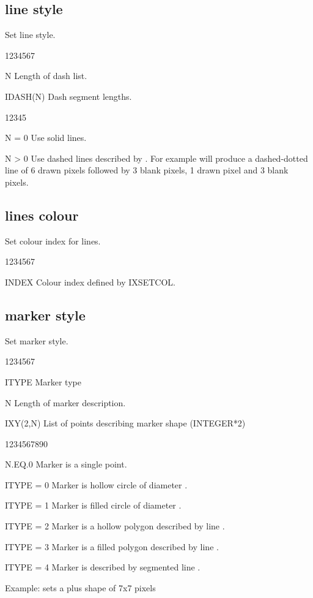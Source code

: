 \subsection{ line style}
%
\Action
Set line style.
\Pdesc
\begin{DLtt}{1234567}
\item[N] Length of dash list.
\item[IDASH(N)] Dash segment lengths.
\begin{DLtt}{12345}
\item[N = 0] Use solid lines.
\item[N > 0] Use dashed lines described by . For example
              will produce a
       dashed-dotted line of 6 drawn pixels followed by 3 blank pixels, 1
       drawn pixel and 3 blank pixels.
\end{DLtt}
\end{DLtt}
\subsection{ lines colour}
%
\Action
Set colour index for lines.
\Pdesc
\begin{DLtt}{1234567}
\item[INDEX] Colour index defined by IXSETCOL.
\end{DLtt}

\newpage%

\subsection{ marker style}
%
\Action
Set marker style.
\Pdesc
\begin{DLtt}{1234567}
\item[ITYPE] Marker type
\item[N] Length of marker description.
\item[IXY(2,N)] List of points describing marker shape (INTEGER*2)
\begin{DLtt}{1234567890}
\item[N.EQ.0] Marker is a single point.
\item[ITYPE = 0 ] Marker is hollow circle of diameter .
\item[ITYPE = 1 ] Marker is filled circle of diameter .
\item[ITYPE = 2 ] Marker is a hollow polygon described by line .
\item[ITYPE = 3 ] Marker is a filled polygon described by line .
\item[ITYPE = 4 ] Marker is described by segmented line .
\end{DLtt}
\end{DLtt}
Example:  sets a plus shape of
7x7 pixels
